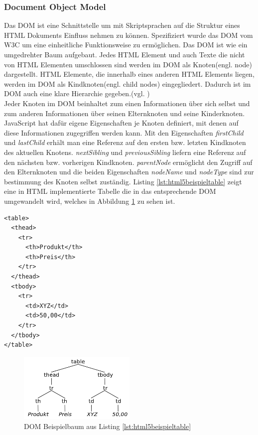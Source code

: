\subsubsection{Document Object Model} Das DOM ist eine Schnittstelle um mit Skriptsprachen auf die Struktur eines HTML Dokuments Einfluss nehmen zu können. Spezifiziert wurde das DOM vom W3C um eine einheitliche Funktionsweise zu ermöglichen. Das DOM ist wie ein umgedrehter Baum aufgebaut. Jedes HTML Element und auch Texte die nicht von HTML Elementen umschlossen sind werden im DOM als Knoten(engl. node) dargestellt. HTML Elemente, die innerhalb eines anderen HTML Elements liegen, werden im DOM als Kindknoten(engl. child nodes) eingegliedert. Dadurch ist im DOM auch eine klare Hierarchie gegeben.(vgl. \cite[S.350]{WenzJava2008})\\Jeder Knoten im DOM beinhaltet zum einen Informationen über sich selbst und zum anderen Informationen über seinen Elternknoten und seine Kinderknoten. JavaScript hat dafür eigene Eigenschaften je Knoten definiert, mit denen auf diese Informationen zugegriffen werden kann. Mit den Eigenschaften \textit{firstChild} und \textit{lastChild} erhält man eine Referenz auf den ersten bzw. letzten Kindknoten des aktuellen Knotens. \textit{nextSibling} und \textit{previousSibling} liefern eine Referenz auf den nächsten bzw. vorherigen Kindknoten. \textit{parentNode} ermöglicht den Zugriff auf den Elternknoten und die beiden Eigenschaften \textit{nodeName} und \textit{nodeType} sind zur bestimmung des Knoten selbst zuständig. Listing \ref{lst:html5beispieltable} zeigt eine in HTML implementierte Tabelle die in das entsprechende DOM umgewandelt wird, welches in Abbildung \ref{fig:dombeispielbaum} zu sehen ist.

	\vspace{1em}
	\begin{lstlisting}[frame=htrbl, caption=DOM5 Beispiel Definition, label=lst:html5beispieltable]
<table>
  <thead>
    <tr>
      <th>Produkt</th>
      <th>Preis</th>
    </tr>
  </thead>
  <tbody>
    <tr>
      <td>XYZ</td>
      <td>50,00</td>
    </tr>
  </tbody>
</table>
	\end{lstlisting}

\begin{figure}[htb]
  \centering
  \includegraphics[width=0.5\textwidth]{abb/dom_sampletree}
  \caption[DOM Beispielbaum aus Listing \ref{lst:html5beispieltable}]{DOM Beispielbaum aus Listing \ref{lst:html5beispieltable}}
  \label{fig:dombeispielbaum}
\end{figure}

